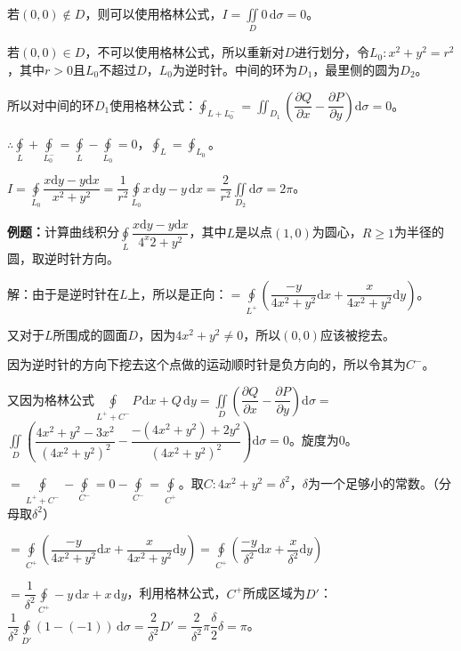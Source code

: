 若$(0,0)\notin D$，则可以使用格林公式，$I=\iint\limits_D0\,\textrm{d}\sigma=0$。

若$(0,0)\in D$，不可以使用格林公式，所以重新对$D$进行划分，令$L_0:x^2+y^2=r^2$，其中$r>0$且$L_0$不超过$D$，$L_0$为逆时针。中间的环为$D_1$，最里侧的圆为$D_2$。

所以对中间的环$D_1$使用格林公式：$\oint_{L+L_0^-}=\iint_{D_1}\left(\dfrac{\partial Q}{\partial x}-\dfrac{\partial P}{\partial y}\right)\textrm{d}\sigma=0$。

$\therefore\oint\limits_L+\oint\limits_{L_0^-}=\oint\limits_L-\oint\limits_{L_0}=0$，$\oint_L=\oint_{L_0}$。

$I=\displaystyle{\oint\limits_{L_0}\dfrac{x\textrm{d}y-y\textrm{d}x}{x^2+y^2}=\dfrac{1}{r^2}\oint\limits_{L_0}x\,\textrm{d}y-y\,\textrm{d}x=\dfrac{2}{r^2}\iint\limits_{D_2}\textrm{d}\sigma=2\pi}$。

\textbf{例题：}计算曲线积分$\oint\limits_L\dfrac{x\textrm{d}y-y\textrm{d}x}{4^x2+y^2}$，其中$L$是以点$(1,0)$为圆心，$R\geqslant1$为半径的圆，取逆时针方向。

解：由于是逆时针在$L$上，所以是正向：$=\displaystyle{\oint\limits_{L^+}\left(\dfrac{-y}{4x^2+y^2}\textrm{d}x+\dfrac{x}{4x^2+y^2}\textrm{d}y\right)}$。

又对于$L$所围成的圆面$D$，因为$4x^2+y^2\neq0$，所以$(0,0)$应该被挖去。

因为逆时针的方向下挖去这个点做的运动顺时针是负方向的，所以令其为$C^-$。

又因为格林公式$\oint\limits_{L^++C^-}P\,\textrm{d}x+Q\,\textrm{d}y=\displaystyle{\iint\limits_D\left(\dfrac{\partial Q}{\partial x}-\dfrac{\partial P}{\partial y}\right)\textrm{d}\sigma}=$\\$\displaystyle{\iint\limits_D\left(\dfrac{4x^2+y^2-3x^2}{(4x^2+y^2)^2}-\dfrac{-(4x^2+y^2)+2y^2}{(4x^2+y^2)^2}\right)\textrm{d}\sigma}=0$。旋度为0。

$=\oint\limits_{L^++C^-}-\oint\limits_{C^-}=0-\oint\limits_{C^-}=\oint\limits_{C^+}$。取$C:4x^2+y^2=\delta^2$，$\delta$为一个足够小的常数。（分母取$\delta^2$）

$=\displaystyle{\oint\limits_{C^+}\left(\dfrac{-y}{4x^2+y^2}\textrm{d}x+\dfrac{x}{4x^2+y^2}\textrm{d}y\right)}=\displaystyle{\oint\limits_{C^+}\left(\dfrac{-y}{\delta^2}\textrm{d}x+\dfrac{x}{\delta^2}\textrm{d}y\right)}$

$=\dfrac{1}{\delta^2}\oint\limits_{C^+}-y\,\textrm{d}x+x\,\textrm{d}y$，利用格林公式，$C^+$所成区域为$D'$：$\dfrac{1}{\delta^2}\oint\limits_{D'}(1-(-1))\,\textrm{d}\sigma=\dfrac{2}{\delta^2}D'=\dfrac{2}{\delta^2}\pi\dfrac{\delta}{2}\delta=\pi$。

%
